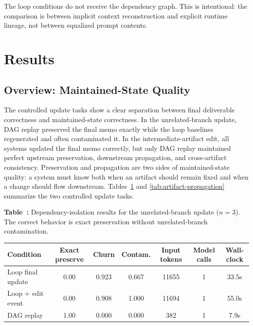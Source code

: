 \documentclass{article}
\begin{document}
The loop conditions do not receive the dependency graph. This is intentional: the comparison is between implicit context reconstruction and explicit runtime lineage, not between equalized prompt contents.

\section{Results}

\subsection{Overview: Maintained-State Quality}

The controlled update tasks show a clear separation between final deliverable correctness and maintained-state correctness. In the unrelated-branch update, DAG replay preserved the final memo exactly while the loop baselines regenerated and often contaminated it. In the intermediate-artifact edit, all systems updated the final memo correctly, but only DAG replay maintained perfect upstream preservation, downstream propagation, and cross-artifact consistency. Preservation and propagation are two sides of maintained-state quality: a system must know both when an artifact should remain fixed and when a change should flow downstream. Tables~\ref{tab:dependency-isolation} and \ref{tab:artifact-propagation} summarize the two controlled update tasks.

\begingroup
\setlength{\intextsep}{8pt}
\begin{table}[H]
\centering
\small
{}
\textbf{Table~\thetable:} Dependency-isolation results for the unrelated-branch update ($n=3$). The correct behavior is exact preservation without unrelated-branch contamination.\par\vspace{4pt}
\label{tab:dependency-isolation}
\begin{tabular}{lcccccc}
\toprule
Condition & Exact preserve & Churn & Contam. & Input tokens & Model calls & Wall-clock \\
\midrule
Loop final update & 0.00 & 0.923 & 0.667 & 11655 & 1 & 33.5s \\
Loop + edit event & 0.00 & 0.908 & 1.000 & 11694 & 1 & 55.0s \\
DAG replay & 1.00 & 0.000 & 0.000 & 382 & 1 & 7.9s \\
\bottomrule
\end{tabular}
\end{table}
\end{document}
